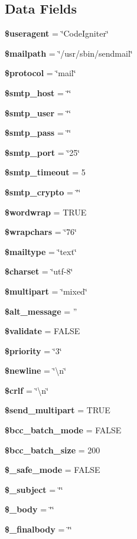 \subsection*{Data Fields}
\begin{DoxyCompactItemize}
\item 
{\bf \$useragent} = \char`\"{}Code\-Igniter\char`\"{}
\item 
{\bf \$mailpath} = \char`\"{}/usr/sbin/sendmail\char`\"{}
\item 
{\bf \$protocol} = \char`\"{}mail\char`\"{}
\item 
{\bf \$smtp\-\_\-host} = \char`\"{}\char`\"{}
\item 
{\bf \$smtp\-\_\-user} = \char`\"{}\char`\"{}
\item 
{\bf \$smtp\-\_\-pass} = \char`\"{}\char`\"{}
\item 
{\bf \$smtp\-\_\-port} = \char`\"{}25\char`\"{}
\item 
{\bf \$smtp\-\_\-timeout} = 5
\item 
{\bf \$smtp\-\_\-crypto} = \char`\"{}\char`\"{}
\item 
{\bf \$wordwrap} = T\-R\-U\-E
\item 
{\bf \$wrapchars} = \char`\"{}76\char`\"{}
\item 
{\bf \$mailtype} = \char`\"{}text\char`\"{}
\item 
{\bf \$charset} = \char`\"{}utf-\/8\char`\"{}
\item 
{\bf \$multipart} = \char`\"{}mixed\char`\"{}
\item 
{\bf \$alt\-\_\-message} = ''
\item 
{\bf \$validate} = F\-A\-L\-S\-E
\item 
{\bf \$priority} = \char`\"{}3\char`\"{}
\item 
{\bf \$newline} = \char`\"{}\textbackslash{}n\char`\"{}
\item 
{\bf \$crlf} = \char`\"{}\textbackslash{}n\char`\"{}
\item 
{\bf \$send\-\_\-multipart} = T\-R\-U\-E
\item 
{\bf \$bcc\-\_\-batch\-\_\-mode} = F\-A\-L\-S\-E
\item 
{\bf \$bcc\-\_\-batch\-\_\-size} = 200
\item 
{\bf \$\-\_\-safe\-\_\-mode} = F\-A\-L\-S\-E
\item 
{\bf \$\-\_\-subject} = \char`\"{}\char`\"{}
\item 
{\bf \$\-\_\-body} = \char`\"{}\char`\"{}
\item 
{\bf \$\-\_\-finalbody} = \char`\"{}\char`\"{}

\end{DoxyCompactItemize}
